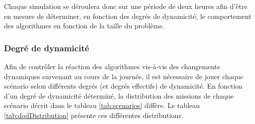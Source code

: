   Chaque simulation se déroulera donc sur une période de deux heures afin d'être en mesure de déterminer, en fonction des degrés de dynamicité, le comportement des algorithmes en fonction de la taille du problème.

  \subsubsection{Degré de dynamicité}

  Afin de contrôler la réaction des algorithmes vis-à-vis des changements dynamiques survenant au cours de la journée, il est nécessaire de jouer chaque scénario selon différents degrés (et degrés effectifs) de dynamicité.
  En fonction d'un degré de dynamicité déterminé, la distribution des missions de chaque scénario décrit dans le tableau \ref{tab:scenarios} diffère. Le tableau \ref{tab:dodDistribution} présente ces différentes distributions.

